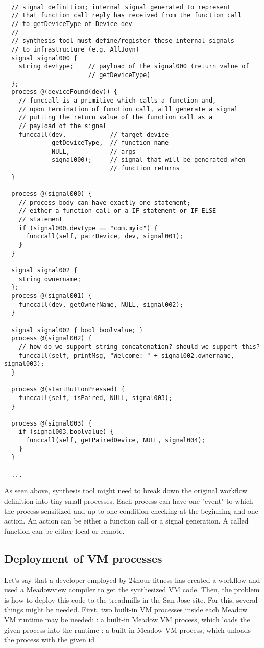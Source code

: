 \documentclass{note}
\begin{document}
\begin{verbatim}

  // signal definition; internal signal generated to represent
  // that function call reply has received from the function call
  // to getDeviceType of Device dev
  //
  // synthesis tool must define/register these internal signals
  // to infrastructure (e.g. AllJoyn)
  signal signal000 {
    string devtype;    // payload of the signal000 (return value of 
                       // getDeviceType)
  };
  process @(deviceFound(dev)) {
    // funccall is a primitive which calls a function and,
    // upon termination of function call, will generate a signal
    // putting the return value of the function call as a 
    // payload of the signal
    funccall(dev,            // target device
             getDeviceType,  // function name
             NULL,           // args
             signal000);     // signal that will be generated when
                             // function returns
  }

  process @(signal000) {
    // process body can have exactly one statement;
    // either a function call or a IF-statement or IF-ELSE
    // statement
    if (signal000.devtype == "com.myid") {
      funccall(self, pairDevice, dev, signal001);
    }
  }

  signal signal002 {
    string ownername;
  };
  process @(signal001) {
    funccall(dev, getOwnerName, NULL, signal002);
  }

  signal signal002 { bool boolvalue; }
  process @(signal002) {
    // how do we support string concatenation? should we support this?
    funccall(self, printMsg, "Welcome: " + signal002.ownername, signal003);
  }

  process @(startButtonPressed) {
    funccall(self, isPaired, NULL, signal003);
  }

  process @(signal003) {
    if (signal003.boolvalue) {
      funccall(self, getPairedDevice, NULL, signal004);
    }
  }

  ...
\end{verbatim}
As seen above, synthesis tool might need to break down the original workflow definition into tiny small processes.
Each process can have one "event" to which the process sensitized 
and up to one condition checking at the beginning and one action.
An action can be either a function call or a signal generation.
A called function can be either local or remote. 


\subsection{Deployment of VM processes}
Let's say that a developer employed by 24hour fitness has created a workflow
and used a Meadowview compiler to get the synthesized VM code. 
Then, the problem is how to deploy this code to the treadmills in the San Jose
site. 
For this, several things might be needed. First, two built-in VM processes
inside each Meadow VM runtime may be needed:
\bit
\w {}: a built-in Meadow VM process, which loads
the given process into the runtime 
\w {}: a built-in Meadow VM process, which
unloads the process with the given id
\eit
\end{document}
